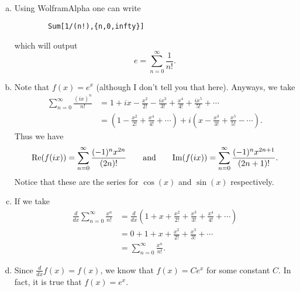 \documentclass[12pt]{article} %
\begin{document}
\begin{solution}~
\begin{enumerate}[(a)]
    \item Using WolframAlpha one can write
    \begin{verbatim}
        Sum[1/(n!),{n,0,infty}]
    \end{verbatim}
    which will output
    \[
    e=\sum_{n=0}^\infty \frac{1}{n!}.
    \]
    \item Note that $f(x)=e^x$ (although I don't tell you that here). Anyways, we take
    \begin{align*}
        \sum_{n=0}^\infty \frac{(ix)^n}{n!} &= 1 + ix - \frac{x^2}{2!} - \frac{ix^3}{3!} + \frac{x^4}{4!} + \frac{ix^5}{5!}+\cdots \\
        &= \left(1-\frac{x^2}{2!} + \frac{x^4}{4!} +\cdots \right) + i \left( x -\frac{x^3}{3!} +\frac{x^5}{5!} -\cdots \right).
    \end{align*}
    Thus we have
    \[
    \mathrm{Re}(f(ix)) = \sum_{n=0}^\infty \frac{(-1)^n x^{2n}}{(2n)!} \qquad \textrm{and} \qquad \mathrm{Im}(f(ix)) = \sum_{n=0}^\infty \frac{(-1)^n x^{2n+1}}{(2n+1)!}.
    \]
    Notice that these are the series for $\cos(x)$ and $\sin(x)$ respectively.
    \item If we take
    \begin{align*}
    \frac{d}{dx}\sum_{n=0}^\infty \frac{x^n}{n!} &= \frac{d}{dx}\left(1+x+\frac{x^2}{2!}+\frac{x^3}{3!}+\frac{x^4}{4!}+\cdots\right)\\
    &= 0 + 1 + x + \frac{x^2}{2!} + \frac{x^3}{3!} + \cdots \\
    &= \sum_{n=0}^\infty \frac{x^n}{n!}.
    \end{align*}
    \item Since $\frac{d}{dx} f(x) =f(x)$, we know that $f(x)=Ce^x$ for some constant $C$. In fact, it is true that $f(x)=e^x$.
\end{enumerate}
\end{solution}
\end{document}
